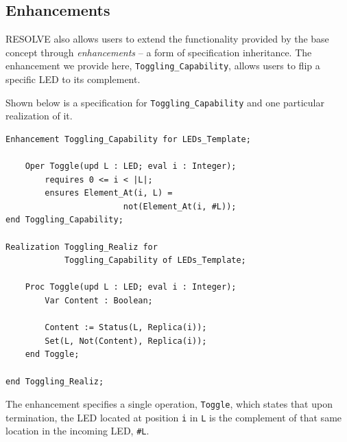 
\subsection{Enhancements}

RESOLVE also allows users to extend the functionality provided by the base concept through \textit{enhancements} -- a form of specification inheritance. The enhancement we provide here, \texttt{Toggling\_Capability}, allows users to flip a specific LED to its complement.

Shown below is a specification for \texttt{Toggling\_Capability} and one particular realization of it.

\begin{verbatim}
Enhancement Toggling_Capability for LEDs_Template;

    Oper Toggle(upd L : LED; eval i : Integer);
        requires 0 <= i < |L|;
        ensures Element_At(i, L) = 
                        not(Element_At(i, #L));
end Toggling_Capability;

Realization Toggling_Realiz for
            Toggling_Capability of LEDs_Template;

    Proc Toggle(upd L : LED; eval i : Integer);
        Var Content : Boolean;
        
        Content := Status(L, Replica(i));
        Set(L, Not(Content), Replica(i));
    end Toggle;
    
end Toggling_Realiz;
\end{verbatim}

The enhancement specifies a single operation, \texttt{Toggle}, which states that upon termination, the LED located at position \texttt{i} in \texttt{L} is the complement of that same location in the incoming LED, \texttt{\#L}.


